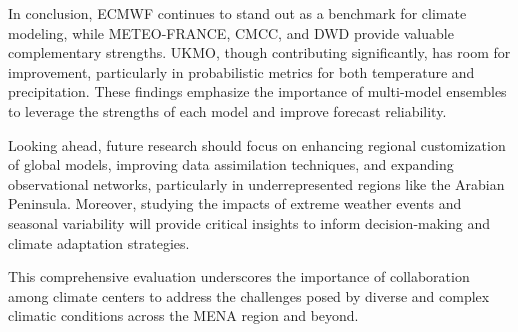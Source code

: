 In conclusion, ECMWF continues to stand out as a benchmark for climate modeling, while METEO-FRANCE, CMCC, and DWD provide valuable complementary strengths. UKMO, though contributing significantly, has room for improvement, particularly in probabilistic metrics for both temperature and precipitation. These findings emphasize the importance of multi-model ensembles to leverage the strengths of each model and improve forecast reliability.

Looking ahead, future research should focus on enhancing regional customization of global models, improving data assimilation techniques, and expanding observational networks, particularly in underrepresented regions like the Arabian Peninsula. Moreover, studying the impacts of extreme weather events and seasonal variability will provide critical insights to inform decision-making and climate adaptation strategies.

This comprehensive evaluation underscores the importance of collaboration among climate centers to address the challenges posed by diverse and complex climatic conditions across the MENA region and beyond.


